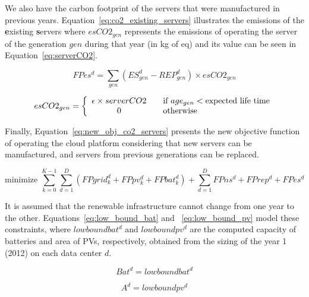 We also have the carbon footprint of the servers that were manufactured in previous years. Equation~\eqref{eq:co2_existing_servers} illustrates the emissions of the \textbf{e}xisting \textbf{s}ervers where $esCO2_{gen}$ represents the emissions of operating the server of the generation $gen$ during that year (in kg of  eq) and its value can be seen in Equation~\eqref{eq:serverCO2}.


\begin{equation} \label{eq:co2_existing_servers}
FPes^d = \sum_{gen} ( ES_{gen}^d - REP_{gen}^d )  \times esCO2_{gen}
\end{equation}

\begin{equation} \label{eq:serverCO2}
esCO2_{gen} =  \left\{ 
  \begin{array}{ c l }
    \epsilon \times serverCO2   & \quad \textrm{if $age_{gen}$}    < \textrm{expected life time}   \\
    0     & \quad \textrm{otherwise  } \\
  \end{array}
\right.
\end{equation}


Finally, Equation~\eqref{eq:new_obj_co2_servers} presents the new objective function of operating the cloud platform considering that new servers can be manufactured, and servers from previous generations can be replaced.

\begin{equation} \label{eq:new_obj_co2_servers}
\text{minimize }\sum_{k=0}^{K-1} \sum_{d=1}^D ( FPgrid^d_k +  FPpv^d_k + FPbat^d_k) + \sum_{d=1}^D   FPns^d + FPrep^d + FPes^d 
\end{equation}

It is assumed that the renewable infrastructure cannot change from one year to the other. Equations~\eqref{eq:low_bound_bat} and  ~\eqref{eq:low_bound_pv} model these constraints, where $lowboundbat^d$ and $lowboundpv^d$ are the computed capacity of batteries and area of PVs, respectively, obtained from the sizing of the year 1 (2012) on each data center $d$.

\begin{equation} \label{eq:low_bound_bat}
Bat^d = lowboundbat^d
\end{equation}

\begin{equation} \label{eq:low_bound_pv}
A^d = lowboundpv^d
\end{equation}

